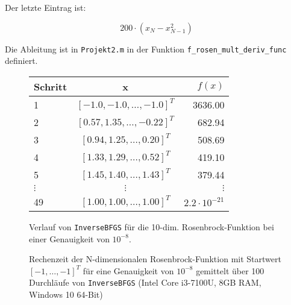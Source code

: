 \documentclass[a4paper, 12pt]{report}
\begin{document}
Der letzte Eintrag ist:

$$200\cdot(x_N - x_{N-1}^2)$$

Die Ableitung ist in \lstinline[basicstyle=\ttfamily\color{black}]|Projekt2.m| in der Funktion
\lstinline[basicstyle=\ttfamily\color{black}]|f_rosen_mult_deriv_func| definiert.

\begin{figure}[H]
  \centering
  \def\arraystretch{1.25}
  \begin{tabular}{l|c|r}
    \hline
    \textbf{Schritt} & \textbf{x} & \textbf{$f(x)$}\\
    \hline
    1 & $[-1.0, -1.0, \ldots, -1.0]^T$ & 3636.00\\
    2 & $[0.57, 1.35, \ldots, -0.22]^T$ & 682.94\\
    3 & $[0.94, 1.25, \ldots, 0.20]^T$ & 508.69\\
    4 & $[1.33, 1.29, \ldots, 0.52]^T$ & 419.10\\
    5 & $[1.45, 1.40, \ldots, 1.43]^T$ & 379.44\\
    $\vdots$ & $\vdots$ & $\vdots$\\
    49 & $[1.00, 1.00, \ldots, 1.00]^T$ & $2.2\cdot 10^{-21}$\\
    \hline
  \end{tabular}
  \caption{Verlauf von \lstinline[basicstyle=\ttfamily\color{black}]|InverseBFGS| für die 10-dim. Rosenbrock-Funktion bei einer Genauigkeit von
          $10^{-8}$.}
\end{figure}

\begin{figure}[H]
  \centering
\caption{Rechenzeit der N-dimensionalen Rosenbrock-Funktion mit Startwert $[-1, \ldots, -1]^T$ für
  eine Genauigkeit von $10^{-8}$ gemittelt über 100 Durchläufe von \lstinline[basicstyle=\ttfamily\color{black}]|InverseBFGS|
  (Intel Core i3-7100U, 8GB RAM, Windows 10 64-Bit)}
\end{figure}
\end{document}
